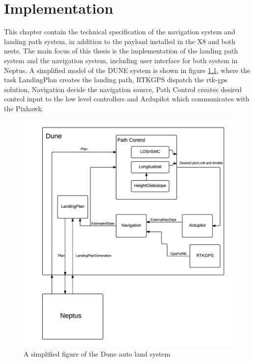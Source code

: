\chapter{Implementation}
This chapter contain the technical specification of the navigation system and landing path system, in addition to the payload installed in the X8 and both nests. The main focus of this thesis is the implementation of the landing path system and the navigation system, including user interface for both system in Neptus. A simplified model of the DUNE system is shown in figure \ref{fig:DuneSystem}, where the task LandingPlan creates the landing path, RTKGPS dispatch the \gls{rtk-gps} solution, Navigation decide the navigation source, Path Control creates desired control input to the low level controllers and Ardupilot which communicates with the Pixhawk.
\begin{figure}[H]
	\centering
		\includegraphics[width=1\textwidth]{figs/DUNESystem.png}
		\caption{A simplified figure of the Dune auto land system}
		\label{fig:DuneSystem}
\end{figure}
